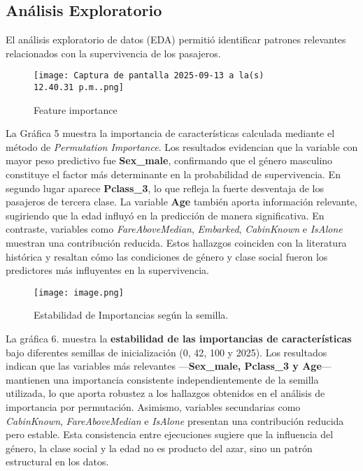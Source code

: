 \documentclass[sjournal]{IEEEtran}
\begin{document}
\subsection{Análisis Exploratorio}
El análisis exploratorio de datos (EDA) permitió identificar patrones relevantes relacionados con la supervivencia de los pasajeros.

    

        \begin{figure}[H]
            \centering
            \texttt{[image: Captura de pantalla 2025-09-13 a la(s) 12.40.31 p.m..png]}
            \caption{ Feature importance}
            \label{fig:placeholder}
        \end{figure}
La Gráfica 5 muestra la importancia de características calculada mediante el método de \textit{Permutation Importance}. Los resultados evidencian que la variable con mayor peso predictivo fue \textbf{Sex\_male}, confirmando que el género masculino constituye el factor más determinante en la probabilidad de supervivencia. En segundo lugar aparece \textbf{Pclass\_3}, lo que refleja la fuerte desventaja de los pasajeros de tercera clase. La variable \textbf{Age} también aporta información relevante, sugiriendo que la edad influyó en la predicción de manera significativa. En contraste, variables como \textit{FareAboveMedian}, \textit{Embarked}, \textit{CabinKnown} e \textit{IsAlone} muestran una contribución reducida. Estos hallazgos coinciden con la literatura histórica y resaltan cómo las condiciones de género y clase social fueron los predictores más influyentes en la supervivencia.
            \begin{figure}[H]
                \centering
                \texttt{[image: image.png]}
                \caption{ Estabilidad de Importancias según la semilla.}
                \label{fig:placeholder}
            \end{figure}
La gráfica 6. muestra la \textbf{estabilidad de las importancias de características} bajo diferentes semillas de inicialización (0, 42, 100 y 2025). Los resultados indican que las variables más relevantes —\textbf{Sex\_male, Pclass\_3 y Age}— mantienen una importancia consistente independientemente de la semilla utilizada, lo que aporta robustez a los hallazgos obtenidos en el análisis de importancia por permutación. Asimismo, variables secundarias como \textit{CabinKnown}, \textit{FareAboveMedian} e \textit{IsAlone} presentan una contribución reducida pero estable. Esta consistencia entre ejecuciones sugiere que la influencia del género, la clase social y la edad no es producto del azar, sino un patrón estructural en los datos.
\end{document}
